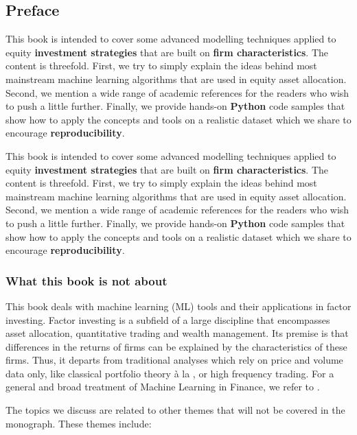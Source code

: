 \subsection{Preface}

This book is intended to cover some advanced modelling techniques applied to equity \textbf{investment strategies} that are built on \textbf{firm characteristics}. The content is threefold. First, we try to simply explain the ideas behind most mainstream machine learning algorithms that are used in equity asset allocation. Second, we mention a wide range of academic references for the readers who wish to push a little further. Finally, we provide hands-on \textbf{Python} code samples that show how to apply the concepts and tools on a realistic dataset which we share to encourage \textbf{reproducibility}.

This book is intended to cover some advanced modelling techniques applied to equity \textbf{investment strategies} that are built on \textbf{firm characteristics}. The content is threefold. First, we try to simply explain the ideas behind most mainstream machine learning algorithms that are used in equity asset allocation. Second, we mention a wide range of academic references for the readers who wish to push a little further. Finally, we provide hands-on \textbf{Python} code samples that show how to apply the concepts and tools on a realistic dataset which we share to encourage \textbf{reproducibility}.

\subsubsection{What this book is not about}

This book deals with machine learning (ML) tools and their applications in factor investing. Factor investing is a subfield of a large discipline that encompasses asset allocation, quantitative trading and wealth management. Its premise is that differences in the returns of firms can be explained by the characteristics of these firms. Thus, it departs from traditional analyses which rely on price and volume data only, like classical portfolio theory à la \citep{markowitz1952portfolio}, or high frequency trading. For a general and broad treatment of Machine Learning in Finance, we refer to \citep{dixon2020machine}.

The topics we discuss are related to other themes that will not be covered in the monograph. These themes include:

